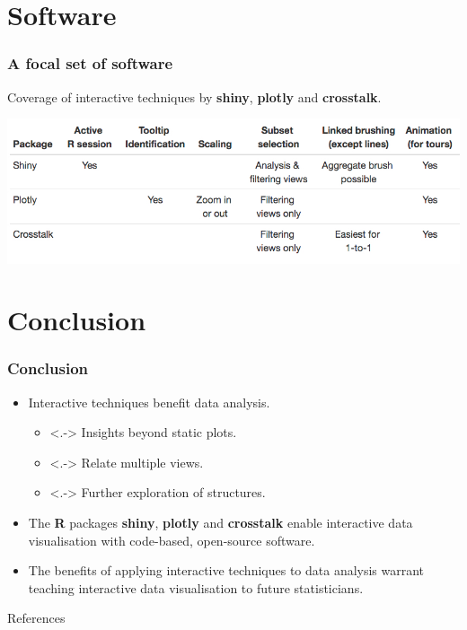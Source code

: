 \documentclass{beamer}
\begin{document}
\section{Software}
\label{sec:software}

\begin{frame}
		\frametitle{A focal set of software}
		Coverage of interactive techniques by \textbf{shiny}, \textbf{plotly} and \textbf{crosstalk}.
		\begin{center}
			\includegraphics[scale=0.38]{files/table.jpeg}
		\end{center}
\end{frame}

\section{Conclusion}
\label{sec:conclusion}

\begin{frame}
\frametitle{Conclusion}
	\begin{itemize}[<+->]
		\item Interactive techniques benefit data analysis.
		\begin{itemize} 
			\item <.-> Insights beyond static plots.
			\item <.-> Relate multiple views.
			\item <.-> Further exploration of structures.
		\end{itemize}
		\item The \textbf{R} packages \textbf{shiny}, \textbf{plotly} and \textbf{crosstalk} enable interactive data visualisation with code-based, open-source software.
		\item The benefits of applying interactive techniques to data analysis warrant teaching interactive data visualisation to future statisticians.
	\end{itemize}
\end{frame}

\begin{frame}[allowframebreaks]{References}
	
	
	\nocite{R}
	\nocite{plotly_R}
	\nocite{crosstalk_R}
	\nocite{shiny_R}
\end{frame}
\end{document}
